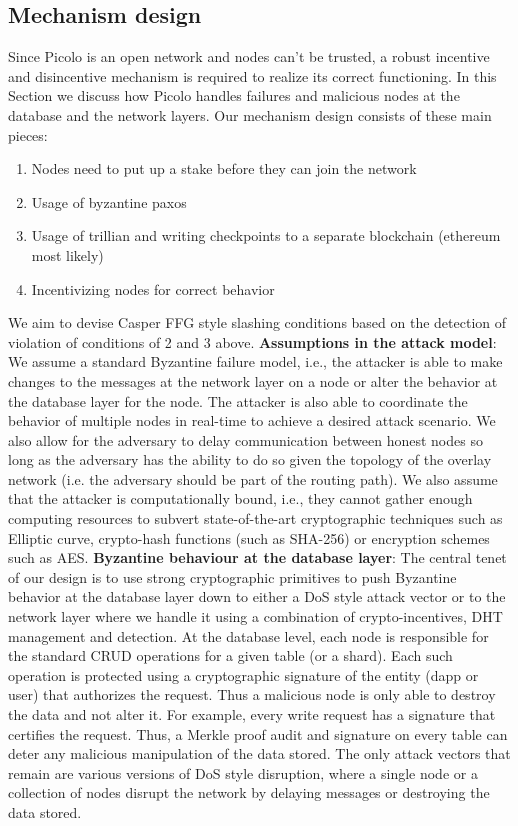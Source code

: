 \subsection{Mechanism design}
Since Picolo is an open network and nodes can't be trusted, a robust incentive and disincentive mechanism is required to realize its correct functioning. In this Section we discuss how Picolo handles failures and malicious nodes at the database and the network layers. Our mechanism design consists of these main pieces:
\begin{enumerate}
	\item Nodes need to put up a stake before they can join the network
	\item Usage of byzantine paxos
	\item Usage of trillian and writing checkpoints to a separate blockchain (ethereum most likely)
	\item Incentivizing nodes for correct behavior
\end{enumerate}
We aim to devise Casper FFG style slashing conditions based on the detection of violation of conditions of 2 and 3 above.
\newline\newline
\textbf{Assumptions in the attack model}: We assume a standard Byzantine failure model, i.e., the attacker is able to make changes to the messages at the network layer on a node or alter the behavior at the database layer for the node. The attacker is also able to coordinate the behavior of multiple nodes in real-time to achieve a desired attack scenario. We also allow for the adversary to delay communication between honest nodes so long as the adversary has the ability to do so given the topology of the overlay network (i.e. the adversary should be part of the routing path). We also assume that the attacker is computationally bound, i.e., they cannot gather enough computing resources to subvert state-of-the-art cryptographic techniques such as Elliptic curve, crypto-hash functions (such as SHA-256) or encryption schemes such as AES.
\newline\newline
\textbf{Byzantine behaviour at the database layer}: The central tenet of our design is to use strong cryptographic primitives to push Byzantine behavior at the database layer down to either a DoS style attack vector or to the network layer where we handle it using a combination of crypto-incentives, DHT management and detection. At the database level, each node is responsible for the standard CRUD operations for a given table (or a shard). Each such operation is protected using a cryptographic signature of the entity (dapp or user) that authorizes the request. Thus a malicious node is only able to destroy the data and not alter it. For example, every write request has a signature that certifies the request. Thus, a Merkle proof audit and signature on every table can deter any malicious manipulation of the data stored. The only attack vectors that remain are various versions of DoS style disruption, where a single node or a collection of nodes disrupt the network by delaying messages or destroying the data stored. 
